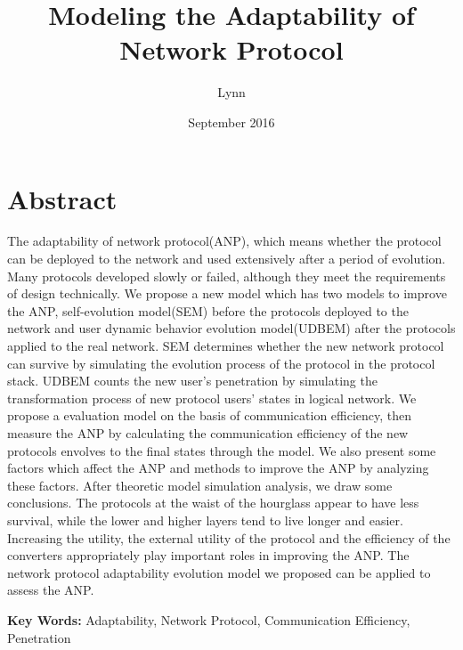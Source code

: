 \documentclass{article}
\title{Modeling the Adaptability of Network Protocol}
\author{Lynn }
\date{September 2016}
\begin{document}
\maketitle

\section*{Abstract}
The adaptability of network protocol(ANP), which means whether the protocol can be deployed to the network
and used extensively after a period of evolution. Many protocols developed slowly or failed, although they
meet the requirements of design technically. We propose a new model which has two models to improve the ANP,
self-evolution model(SEM) before the protocols deployed to the network and user dynamic behavior evolution
model(UDBEM) after the protocols applied to the real network. SEM determines whether the new network protocol
can survive by simulating the evolution process of the protocol in the protocol stack. UDBEM counts the new
user's penetration by simulating the transformation process of new protocol users' states in logical network.
We propose a evaluation model on the basis of communication efficiency, then measure the ANP by calculating
the communication efficiency of the new protocols envolves to the final states through the model. We also
present some factors which affect the ANP and methods to improve the ANP by analyzing these factors. After
theoretic model simulation analysis, we draw some conclusions. The protocols at the waist of the hourglass
appear to have less survival, while the lower and higher layers tend to live longer and easier. Increasing
the utility, the external utility of the protocol and the efficiency of the converters appropriately play
important roles in improving the ANP. The network protocol adaptability evolution model we proposed can be
applied to assess the ANP.

\setlength{\parskip}{0.5\baselineskip}
\par\noindent \textbf {Key Words:}
Adaptability, Network Protocol, Communication Efficiency, Penetration
\end{document}
